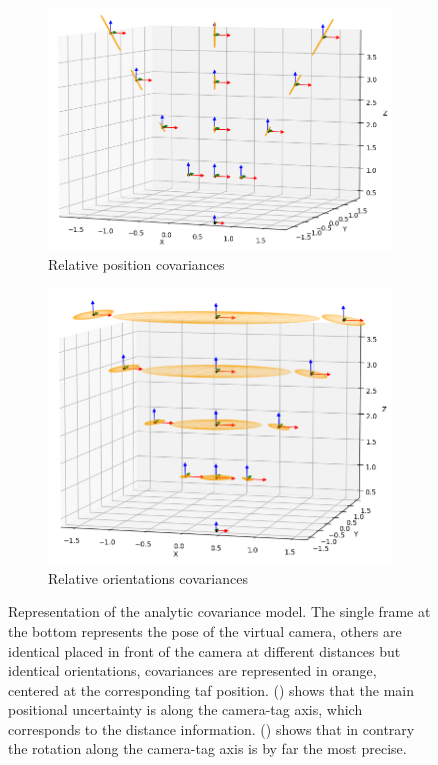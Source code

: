 \begin{figure}[h]
    \centering
    \begin{subfigure}{.49\linewidth}
        \centering
        \includegraphics[width=\textwidth]{figures/apriltag_cov_posi.png}
        \caption{Relative position covariances \label{fig:apriltag_cov_posi}}
    \end{subfigure}%
    \hfill
    \begin{subfigure}{.49\linewidth}
        \centering
        \includegraphics[width=\textwidth]{figures/apriltag_cov_orientation.png}
        \caption{Relative orientations covariances \label{fig:apriltag_cov_orientation}}
    \end{subfigure}%
    \caption{Representation of the analytic covariance model. The single frame at the bottom represents the pose of the virtual camera, others are identical 
    \apriltags placed in front of the camera at different distances but identical orientations, covariances are represented in orange, centered at the corresponding taf position.
    () shows that the main positional uncertainty is along the camera-tag axis, which corresponds to the distance information. 
    () shows that in contrary the rotation along the camera-tag axis is by far the most precise.}
    \label{fig:apriltag_cov}
\end{figure}

